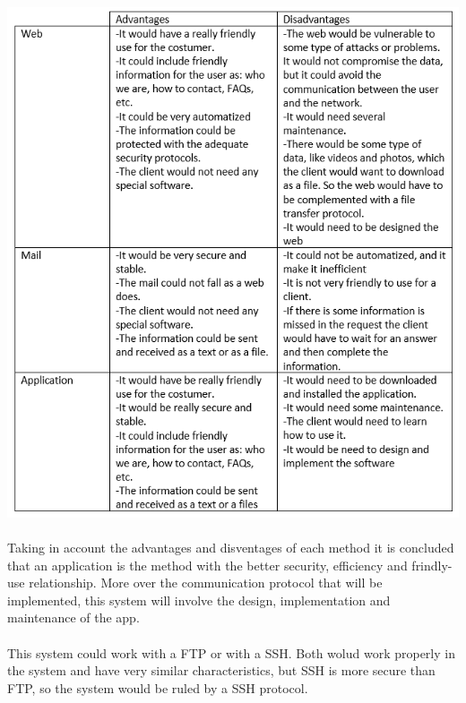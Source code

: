 \begin{center}
\includegraphics[scale=1]{Parts/tabla}
\end{center}

\paragraph{}
Taking in account the advantages and disventages of each method it is concluded that an application is the method with the better security, efficiency and frindly-use relationship. More over the communication protocol that will be implemented, this system will involve the design, implementation and maintenance of the app. 
\paragraph{}
This system could work with a FTP or with a SSH. Both wolud work properly in the system and have very similar characteristics, but SSH is more secure than FTP, so the system would be ruled by a SSH protocol.



